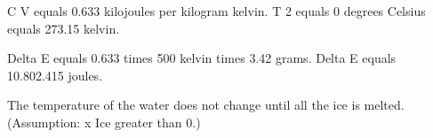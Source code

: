 C V equals 0.633 kilojoules per kilogram kelvin.  
T 2 equals 0 degrees Celsius equals 273.15 kelvin.  

Delta E equals 0.633 times 500 kelvin times 3.42 grams.  
Delta E equals 10.802.415 joules.  

The temperature of the water does not change until all the ice is melted. (Assumption: x Ice greater than 0.)